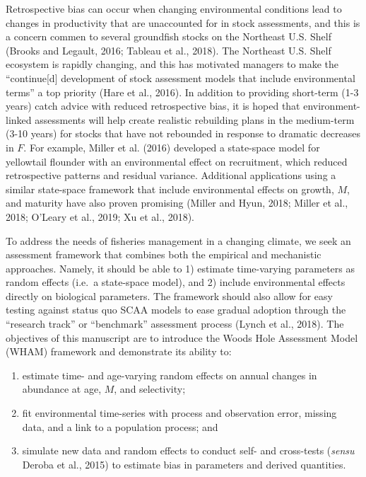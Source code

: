 \documentclass[]{article}
\providecommand{\tightlist}{%
  \setlength{\itemsep}{0pt}\setlength{\parskip}{0pt}}
\begin{document}
Retrospective bias can occur when changing environmental conditions lead
to changes in productivity that are unaccounted for in stock
assessments, and this is a concern commen to several groundfish stocks
on the Northeast U.S. Shelf (Brooks and Legault, 2016; Tableau et al.,
2018). The Northeast U.S. Shelf ecosystem is rapidly changing, and this
has motivated managers to make the ``continue{[}d{]} development of
stock assessment models that include environmental terms'' a top
priority (Hare et al., 2016). In addition to providing short-term (1-3
years) catch advice with reduced retrospective bias, it is hoped that
environment-linked assessments will help create realistic rebuilding
plans in the medium-term (3-10 years) for stocks that have not rebounded
in response to dramatic decreases in \(F\). For example, Miller et al.
(2016) developed a state-space model for yellowtail flounder with an
environmental effect on recruitment, which reduced retrospective
patterns and residual variance. Additional applications using a similar
state-space framework that include environmental effects on growth,
\(M\), and maturity have also proven promising (Miller and Hyun, 2018;
Miller et al., 2018; O'Leary et al., 2019; Xu et al., 2018).

To address the needs of fisheries management in a changing climate, we
seek an assessment framework that combines both the empirical and
mechanistic approaches. Namely, it should be able to 1) estimate
time-varying parameters as random effects (i.e.~a state-space model),
and 2) include environmental effects directly on biological parameters.
The framework should also allow for easy testing against status quo SCAA
models to ease gradual adoption through the ``research track'' or
``benchmark'' assessment process (Lynch et al., 2018). The objectives of
this manuscript are to introduce the Woods Hole Assessment Model (WHAM)
framework and demonstrate its ability to:

\begin{enumerate}
\def\labelenumi{\arabic{enumi}.}
\tightlist
\item
  estimate time- and age-varying random effects on annual changes in
  abundance at age, \(M\), and selectivity;
\item
  fit environmental time-series with process and observation error,
  missing data, and a link to a population process; and
\item
  simulate new data and random effects to conduct self- and cross-tests
  (\emph{sensu} Deroba et al., 2015) to estimate bias in parameters and
  derived quantities.
\end{enumerate}
\end{document}
